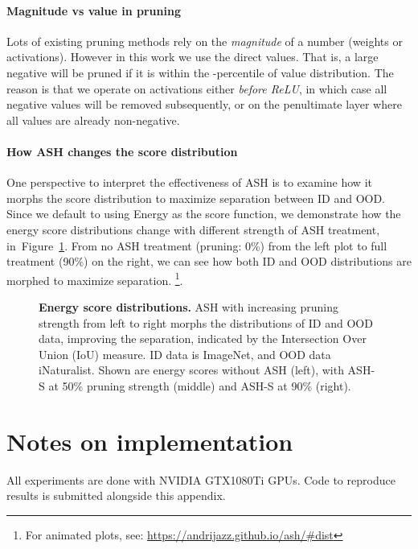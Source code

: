 \documentclass{article}
\newcommand{\figlabel}[1]{\label{fig:#1}}
\newcommand{\figref}[1]{Figure~\ref{fig:#1}}
\newcommand{\seclabel}[1]{\label{sec:#1}}
\begin{document}
\paragraph{Magnitude vs value in pruning} Lots of existing pruning methods rely on the \emph{magnitude} of a number (weights or activations). However in this work we use the direct values. That is, a large negative will be pruned if it is within the -percentile of value distribution. The reason is that we operate on activations either \emph{before ReLU}, in which case all negative values will be removed subsequently, or on the penultimate layer where all values are already non-negative.




\paragraph{How ASH changes the score distribution}
One perspective to interpret the effectiveness of ASH is to examine how it morphs the score distribution to maximize separation between ID and OOD. Since we default to using Energy as the score function, we demonstrate how the energy score distributions change with different strength of ASH treatment, in~\figref{distributions}. From no ASH treatment (pruning: 0\%) from the left plot to full treatment (90\%) on the right, we can see how both ID and OOD distributions are morphed to maximize separation.
\footnote{For animated plots, see: \url{https://andrijazz.github.io/ash/\#dist}}.


\begin{figure}[hbt!]
    \caption{\textbf{Energy score distributions.} ASH with increasing pruning strength from left to right morphs the distributions of ID and OOD data, improving the separation, indicated by the Intersection Over Union (IoU) measure. ID data is ImageNet, and OOD data iNaturalist. Shown are energy scores without ASH (left), with ASH-S at 50\% pruning strength (middle) and ASH-S at 90\% (right).}
    \figlabel{distributions}
\end{figure}





\section{Notes on implementation}
\seclabel{impl-notes}
All experiments are done with NVIDIA GTX1080Ti GPUs. Code to reproduce results is submitted alongside this appendix.
\end{document}
